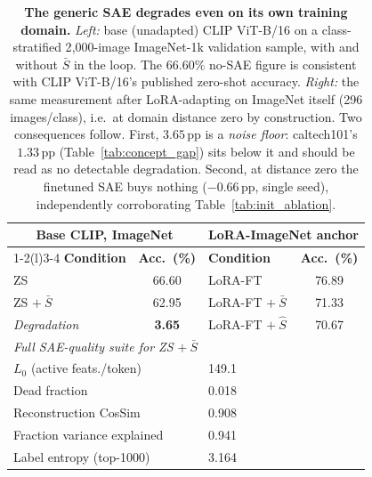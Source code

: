 \begin{table}[htbp]
\centering
\small
\caption{\textbf{The generic SAE degrades even on its own training domain.}
\emph{Left:} base (unadapted) CLIP ViT-B/16 on a class-stratified 2{,}000-image
ImageNet-1k validation sample, with and without $\bar{S}$ in the loop. The $66.60\%$
no-SAE figure is consistent with CLIP ViT-B/16's published zero-shot accuracy.
\emph{Right:} the same measurement after LoRA-adapting on ImageNet itself
(296 images/class), i.e.\ at domain distance zero by construction. Two consequences
follow. First, $3.65$\,pp is a \emph{noise floor}: caltech101's $1.33$\,pp
(Table~\ref{tab:concept_gap}) sits below it and should be read as no detectable
degradation. Second, at distance zero the finetuned SAE buys nothing ($-0.66$\,pp,
single seed), independently corroborating Table~\ref{tab:init_ablation}.}
\label{tab:imagenet_baseline}
\setlength{\tabcolsep}{5pt}
\begin{tabular}{lc@{\hskip 5mm}lc}
\toprule
\multicolumn{2}{c}{\textbf{Base CLIP, ImageNet}} & \multicolumn{2}{c}{\textbf{LoRA-ImageNet anchor}} \\
\cmidrule(r){1-2}\cmidrule(l){3-4}
\textbf{Condition} & \textbf{Acc.\ (\%)} & \textbf{Condition} & \textbf{Acc.\ (\%)} \\
\midrule
ZS                & 66.60 & LoRA-FT               & 76.89 \\
ZS $+\ \bar{S}$   & 62.95 & LoRA-FT $+\ \bar{S}$  & 71.33 \\
\emph{Degradation} & \bf 3.65 & LoRA-FT $+\ \hat{S}$ & 70.67 \\
\midrule
\multicolumn{4}{l}{\emph{Full SAE-quality suite for ZS $+\ \bar{S}$}} \\
\multicolumn{2}{l}{\quad $L_0$ (active feats./token)} & \multicolumn{2}{l}{149.1} \\
\multicolumn{2}{l}{\quad Dead fraction}               & \multicolumn{2}{l}{0.018} \\
\multicolumn{2}{l}{\quad Reconstruction CosSim}       & \multicolumn{2}{l}{0.908} \\
\multicolumn{2}{l}{\quad Fraction variance explained} & \multicolumn{2}{l}{0.941} \\
\multicolumn{2}{l}{\quad Label entropy (top-1000)}    & \multicolumn{2}{l}{3.164} \\
\bottomrule
\end{tabular}
\end{table}
